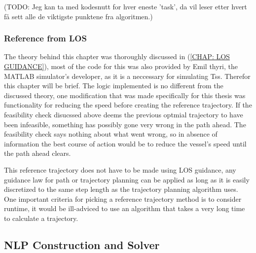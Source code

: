 (TODO: Jeg kan ta med kodesnutt for hver eneste 'task', da vil leser etter hvert få sett alle de viktigste punktene fra algoritmen.)

\subsubsection*{Reference from LOS}
The theory behind this chapter was thoroughly discussed in (\ref{CHAP: LOS GUIDANCE}), most of the code for this was also provided by
Emil thyri, the MATLAB simulator's developer, as it is a neccessary for simulating \gls{Ts}s. Therefor this chapter will be brief. The logic implemented
is no different from the discussed theory, one modification that was made specifically for this thesis was functionality for reducing the speed
before creating the reference trajectory. If the feasibility check disucssed above deems the previous optmial trajectory to have been infeasible, something
has possibly gone very wrong in the path ahead. The feasibility check says nothing about what went wrong, so in absence of information the best
course of action would be to reduce the vessel's speed until the path ahead clears. 

This reference trajectory does not have to be made using LOS guidance, any guidance law for path or trajectory planning can be applied as long as
it is easily discretized to the same step length as the trajectory planning algorithm uses. One important criteria for picking a reference trajectory 
method is to consider runtime, it would be ill-adviced to use an algorithm that takes a very long time to calculate a trajectory.

\subsection{NLP Construction and Solver} 

